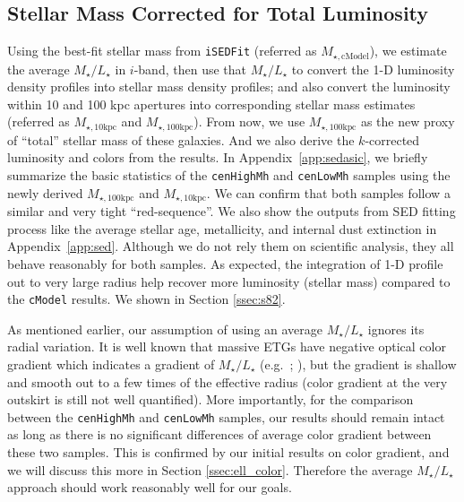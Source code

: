 \documentclass{emulateapj}
\def\cmodel{\texttt{cModel}}
\def\rbcg{\texttt{cenHighMh}}
\def\nbcg{\texttt{cenLowMh}}
\def\minn{{$M_{\star,10\mathrm{kpc}}$}}
\def\mtot{{$M_{\star,100\mathrm{kpc}}$}}
\def\mcmodel{{$M_{\star,\mathrm{cModel}}$}}
\def\m2l{{$M_{\star}/L_{\star}$}}
\begin{document}
\begin{CJK*}{UTF8}{gbsn}
\subsection{Stellar Mass Corrected for Total Luminosity}
    \label{ssec:mtotal}
    
    Using the best-fit stellar mass from \texttt{iSEDFit} (referred as \mcmodel{}), 
    we estimate the average \m2l{} in $i$-band, then use that \m2l{} to convert the 
    1-D luminosity density profiles into stellar mass density profiles; and 
    also convert the luminosity within 10 and 100 kpc apertures into 
    corresponding stellar mass estimates (referred as \minn{} and \mtot{}). 
    From now, we use \mtot{} as the new proxy of ``total'' stellar mass of these 
    galaxies.  
    And we also derive the $k$-corrected luminosity and colors from the results.
    In Appendix~\ref{app:sedasic}, we briefly summarize the basic statistics of 
    the \rbcg{} and \nbcg{} samples using the newly derived \mtot{} and \minn{}.
    We can confirm that both samples follow a similar and very tight ``red-sequence''.
    We also show the outputs from SED fitting process like the average stellar age, 
    metallicity, and internal dust extinction in Appendix~\ref{app:sed}.
    Although we do not rely them on scientific analysis, they all behave reasonably for 
    both samples. 
    As expected, the integration of 1-D profile out to very large radius help 
    recover more luminosity (stellar mass) compared to the \cmodel{} results. 
    We shown in Section \ref{ssec:s82}.
    
    As mentioned earlier, our assumption of using an average \m2l{} ignores its
    radial variation.   
    It is well known that massive ETGs have negative optical color gradient which 
    indicates a gradient of \m2l{} (e.g.\ \citealt{LaBarbera2012}; 
    \citealt{DSouza2015}), but the gradient is shallow and smooth out to a few 
    times of the effective radius (color gradient at the very outskirt is still 
    not well quantified). 
    More importantly, for the comparison between the \rbcg{} and \nbcg{} samples, 
    our results should remain intact as long as there is no significant
    differences of average color gradient between these two samples.
    This is confirmed by our initial results on color gradient, and we will 
    discuss this more in Section \ref{ssec:ell_color}.
    Therefore the average \m2l{} approach should work reasonably well for our goals.
    

\end{CJK*}
\end{document}
